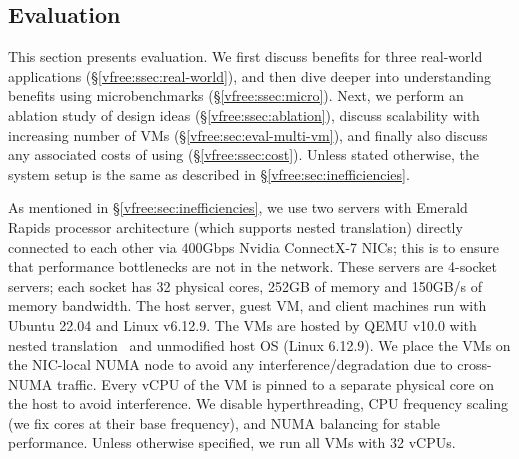\subsection{Evaluation}
\label{vfree:sec:eval}


This section presents {\vfreename} evaluation. We first discuss {\vfreename} benefits for three real-world applications (\S\ref{vfree:ssec:real-world}), and then dive deeper into understanding {\vfreename} benefits using microbenchmarks (\S\ref{vfree:ssec:micro}). Next, we perform an ablation study of {\vfreename} design ideas (\S\ref{vfree:ssec:ablation}), discuss {\vfreename} scalability with increasing number of VMs (\S\ref{vfree:sec:eval-multi-vm}), and finally also discuss any associated costs of using {\vfreename} (\S\ref{vfree:ssec:cost}). 
Unless stated otherwise, the system setup is the same as described in \S\ref{vfree:sec:inefficiencies}. 

As mentioned in \S\ref{vfree:sec:inefficiencies}, we use two servers with Emerald Rapids processor architecture (which supports nested translation) directly connected to each other via $400$Gbps Nvidia ConnectX-7 NICs; this is to ensure that performance bottlenecks are not in the network. 
These servers are 4-socket servers; each socket has
  32 physical cores, 252GB of memory and 150GB/s of memory bandwidth.
The host server, guest VM, and client machines run with Ubuntu 22.04 and Linux v6.12.9. 
The VMs are hosted by QEMU v10.0 with nested translation~\cite{yiliu1765qemu}
and unmodified host OS (Linux 6.12.9).
We place the VMs on the NIC-local NUMA node to avoid any interference/degradation 
  due to cross-NUMA traffic.
Every vCPU of the VM is pinned to a separate physical core on the host to avoid interference. 
  We disable hyperthreading, CPU frequency scaling (we fix cores at their base frequency), and NUMA balancing for stable performance. 
Unless otherwise specified, we run all VMs with 32 vCPUs.

